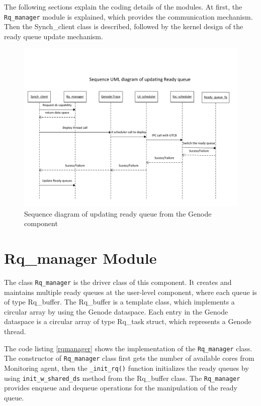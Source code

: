 The following sections explain the coding details of the modules. At first, the \texttt{Rq\_manager} module is explained, which provides the communication mechanism. Then the Synch\_client class is described, followed by the kernel design of the ready queue update mechanism.

\begin{figure}[h]
\centering
\includegraphics[width=1.0\linewidth]{figures/sequence_classUpdate}
\caption{Sequence diagram of updating ready queue from the Genode component}
\label{fig:sequence_classUpdate}
\end{figure}

\section{Rq\_manager Module}

 The class \texttt{Rq\_manager} is the driver class of this component. It creates and maintains multiple ready queues at the user-level component, where each queue is of type Rq\_buffer. The Rq\_buffer is a template class, which implements a circular array by using the Genode dataspace. Each entry in the Genode dataspace is a circular array of type Rq\_task struct, which represents a Genode thread.

The code listing \ref{rqmanager} shows the implementation of the \texttt{Rq\_manager} class. The constructor of \texttt{Rq\_manager} class first gets the number of available cores from Monitoring agent, then the \texttt{\_init\_rq()} function initializes the ready queues by using \texttt{init\_w\_shared\_ds} method from the Rq\_buffer class. The \texttt{Rq\_manager} provides enqueue and dequeue operations for the manipulation of the ready queue.

